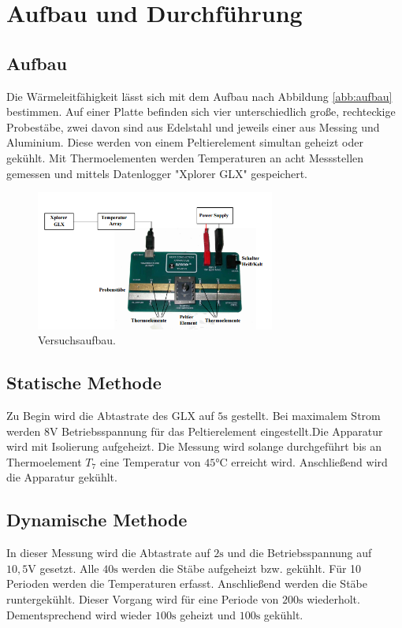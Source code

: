 \section{Aufbau und Durchführung}
\label{sec:Durchführung}
\subsection{Aufbau}
Die Wärmeleitfähigkeit lässt sich mit dem Aufbau nach Abbildung \ref{abb:aufbau}
bestimmen. Auf einer Platte befinden sich vier unterschiedlich große,
rechteckige Probestäbe, zwei davon sind aus Edelstahl und jeweils einer
aus Messing und Aluminium. Diese werden von einem Peltierelement simultan
geheizt oder gekühlt. Mit Thermoelementen werden Temperaturen an acht Messstellen
gemessen und mittels Datenlogger "Xplorer GLX" gespeichert.
\begin{figure}
  \centering
  \includegraphics[width=0.7\textwidth]{aufbau.png}
\caption{Versuchsaufbau.}
\label{fig:aufbau}
\end{figure}
\subsection{Statische Methode}
Zu Begin wird die Abtastrate des GLX auf $5 \si{\second}$ gestellt.
Bei maximalem Strom werden $8 \si{\volt}$ Betriebsspannung für das
Peltierelement eingestellt.Die Apparatur wird mit Isolierung aufgeheizt.
Die Messung wird solange durchgeführt bis an Thermoelement $T_7$ eine
Temperatur von $45\si{\degreeCelsius}$ erreicht wird.
Anschließend wird die Apparatur gekühlt.
\subsection{Dynamische Methode}
In dieser Messung wird die Abtastrate auf $2\si{\second}$
und die Betriebsspannung auf $10,5\si{\volt}$ gesetzt.
Alle $40\si{\second}$ werden die Stäbe aufgeheizt bzw. gekühlt.
Für 10 Perioden werden die Temperaturen erfasst.
Anschließend werden die Stäbe runtergekühlt.
Dieser Vorgang wird für eine Periode von $200\si{\second}$ wiederholt.
Dementsprechend wird wieder $100\si{\second}$ geheizt und $100\si{\second}$ gekühlt.
